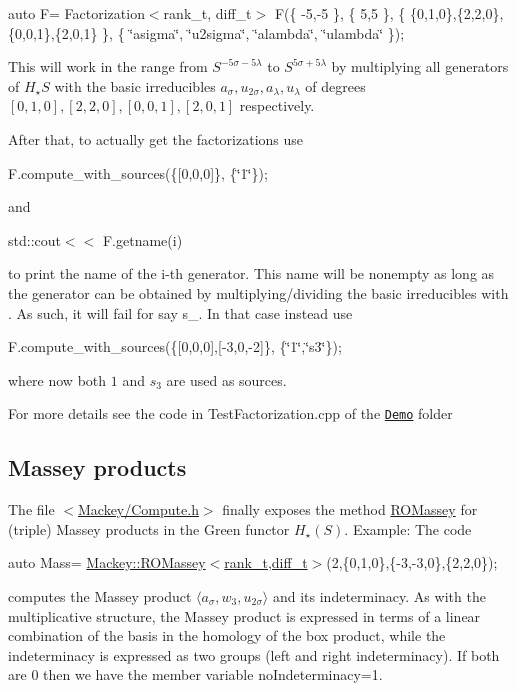 {\ttfamily auto F= Factorization$<$rank\+\_\+t, diff\+\_\+t$>$ F(\{ -\/5,-\/5 \}, \{ 5,5 \}, \{ \{0,1,0\},\{2,2,0\},\{0,0,1\},\{2,0,1\} \}, \{ \char`\"{}asigma\char`\"{}, \char`\"{}u2sigma\char`\"{}, \char`\"{}alambda\char`\"{}, \char`\"{}ulambda\char`\"{} \});}

This will work in the range from $S^{-5\sigma-5\lambda}$ to $S^{5\sigma+5\lambda}$ by multiplying all generators of $H_{\star}S$ with the basic irreducibles $ a_{\sigma}, u_{2\sigma}, a_{\lambda}, u_{\lambda}$ of degrees $[0,1,0],[2,2,0],[0,0,1],[2,0,1]$ respectively.

After that, to actually get the factorizations use

{\ttfamily F.\+compute\+\_\+with\+\_\+sources(\{\mbox{[}0,0,0\mbox{]}\}, \{\char`\"{}1\char`\"{}\});}

and

{\ttfamily std\+::cout$<$$<$ F.\+getname(i) }

to print the name of the {\ttfamily i}-\/th generator. This name will be nonempty as long as the generator can be obtained by multiplying/dividing the basic irreducibles with {}. As such, it will fail for say {\ttfamily s\+\_}. In that case instead use

{\ttfamily F.\+compute\+\_\+with\+\_\+sources(\{\mbox{[}0,0,0\mbox{]},\mbox{[}-\/3,0,-\/2\mbox{]}\}, \{\char`\"{}1\char`\"{},\char`\"{}s3\char`\"{}\});}

where now both $1$ and $s_3$ are used as sources.

For more details see the code in Test\+Factorization.\+cpp of the \href{https://github.com/NickG-Math/Mackey/tree/master/Demo}{\tt Demo} folder\hypertarget{use_step1Mass}{}\subsection{Massey products}\label{use_step1Mass}
The file {\ttfamily $<$\hyperlink{Compute_8h}{Mackey/\+Compute.\+h}$>$} finally exposes the method \hyperlink{namespaceMackey_aa98cd58919c2f716d8df7d61ef1f5c07}{R\+O\+Massey} for (triple) Massey products in the Green functor $H_{\star}(S)$. Example\+: The code

{\ttfamily auto Mass= \hyperlink{namespaceMackey_aa98cd58919c2f716d8df7d61ef1f5c07}{Mackey\+::\+R\+O\+Massey$<$rank\+\_\+t,diff\+\_\+t$>$}(2,\{0,1,0\},\{-\/3,-\/3,0\},\{2,2,0\});}

computes the Massey product $\langle a_{\sigma},w_3,u_{2\sigma}\rangle $ and its indeterminacy. As with the multiplicative structure, the Massey product is expressed in terms of a linear combination of the basis in the homology of the box product, while the indeterminacy is expressed as two groups (left and right indeterminacy). If both are $0$ then we have the member variable {\ttfamily no\+Indeterminacy=1}.

